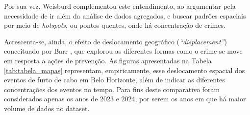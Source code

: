 Por sua vez, Weisburd \cite{Weisburd2015} complementou este entendimento, ao argumentar pela necessidade de ir além da análise de dados agregados, e buscar padrões espaciais por meio de \textit{hotspots}, ou pontos quentes, onde há concentração de crimes. 

Acrescenta-se, ainda, o efeito de deslocamento geográfico (\textit{``displacement''}) conceituado por Barr \cite{Barr1990}, que explorou as diferentes formas como o crime se move em resposta a ações de prevenção. As figuras apresentadas na Tabela \ref{tab:tabela_mapas} representam, empiricamente, esse deslocamento espacial dos eventos de furto de cabo em Belo Horizonte, além de indicar as diferentes concentrações dos eventos no tempo. Para fins deste comparativo foram considerados apenas os anos de 2023 e 2024, por serem os anos em que há maior volume de dados no dataset.

